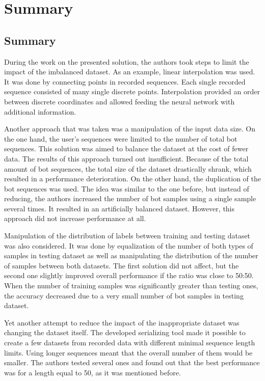 \chapter{Summary}\label{ch:summary}

\section{Summary}\label{sec:summary}
During the work on the presented solution, the authors took steps to limit the impact of the imbalanced dataset.
As an example, linear interpolation was used.
It was done by connecting points in recorded sequences.
Each single recorded sequence consisted of many single discrete points.
Interpolation provided an order between discrete coordinates and allowed feeding the neural network with additional information.

Another approach that was taken was a manipulation of the input data size.
On the one hand, the user's sequences were limited to the number of total bot sequences.
This solution was aimed to balance the dataset at the cost of fewer data.
The results of this approach turned out insufficient.
Because of the total amount of bot sequences, the total size of the dataset drastically shrank, which resulted in a performance deterioration.
On the other hand, the duplication of the bot sequences was used.
The idea was similar to the one before, but instead of reducing, the authors increased the number of bot samples using a single sample several times.
It resulted in an artificially balanced dataset.
However, this approach did not increase performance at all.

Manipulation of the distribution of labels between training and testing dataset was also considered.
It was done by equalization of the number of both types of samples in testing dataset as well as manipulating the distribution of the number of samples between both datasets.
The first solution did not affect, but the second one slightly improved overall performance if the ratio was close to \num{50}:\num{50}.
When the number of training samples was significantly greater than testing ones, the accuracy decreased due to a very small number of bot samples in testing dataset.

Yet another attempt to reduce the impact of the inappropriate dataset was changing the dataset itself.
The developed serializing tool made it possible to create a few datasets from recorded data with different minimal sequence length limits.
Using longer sequences meant that the overall number of them would be smaller.
The authors tested several ones and found out that the best performance was for a length equal to \num{50}, as it was mentioned before.


